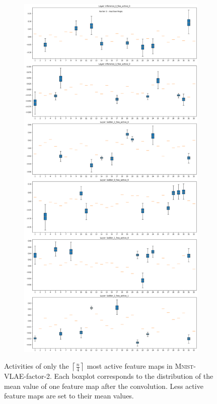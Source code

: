 \begin{figure}[H]
    \centering
    \begin{subfigure}{\textwidth}
        \centering
        \includegraphics[height=.8\textheight]{images/sparseness/encoder_fm2_fms_inactive.png}
    \end{subfigure}
    \caption[\textsc{Mnist}-VLAE-factor-2: Most Active Feature Maps]{Activities of only the $\left \lceil \frac{n}{4} \right \rceil$ most active feature maps in \textsc{Mnist}-\ac{VLAE}-factor-2.
    Each boxplot corresponds to the distribution of the mean value of one feature map after the convolution.
    Less active feature maps are set to their mean values.
    }
\end{figure}
